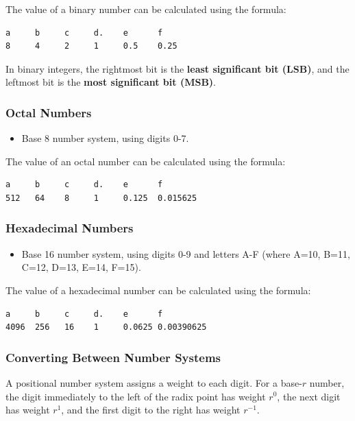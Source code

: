 \documentclass[11pt,a4paper]{article}
\providecommand{\tightlist}{\setlength{\itemsep}{1pt}\setlength{\parskip}{0pt}}
\begin{document}
The value of a binary number can be calculated using the formula:

\begin{verbatim}
a     b     c     d.    e      f
8     4     2     1     0.5    0.25
\end{verbatim}

In binary integers, the rightmost bit is the \textbf{least significant
bit (LSB)}, and the leftmost bit is the \textbf{most significant bit
(MSB)}.

\subsubsection{Octal Numbers}\label{octal-numbers}

\begin{itemize}
\tightlist
\item
  Base 8 number system, using digits 0-7.
\end{itemize}

The value of an octal number can be calculated using the formula:

\begin{verbatim}
a     b     c     d.    e      f
512   64    8     1     0.125  0.015625
\end{verbatim}

\subsubsection{Hexadecimal Numbers}\label{hexadecimal-numbers}

\begin{itemize}
\tightlist
\item
  Base 16 number system, using digits 0-9 and letters A-F (where A=10,
  B=11, C=12, D=13, E=14, F=15).
\end{itemize}

The value of a hexadecimal number can be calculated using the formula:

\begin{verbatim}
a     b     c     d.    e      f
4096  256   16    1     0.0625 0.00390625 
\end{verbatim}

\subsubsection{Converting Between Number
Systems}\label{converting-between-number-systems}

A positional number system assigns a weight to each digit. For a
base-\(r\) number, the digit immediately to the left of the radix point
has weight \(r^0\), the next digit has weight \(r^1\), and the first
digit to the right has weight \(r^{-1}\).
\end{document}
